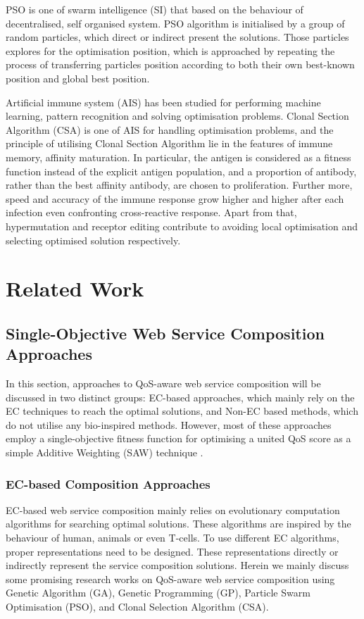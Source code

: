 PSO is one of swarm intelligence (SI) that based on the behaviour of decentralised, self organised system. PSO algorithm is initialised by a group of random particles, which direct or indirect present the solutions. Those particles explores for the optimisation position, which is approached by repeating the process of transferring particles position according to both their own best-known position and global best position.

Artificial immune system (AIS) has been studied for performing machine learning, pattern recognition and solving optimisation problems.  Clonal Section Algorithm (CSA) is one of AIS for handling optimisation problems, and the principle of utilising Clonal Section Algorithm lie in the features of immune memory, affinity maturation. In particular, the antigen is considered as a fitness function instead of the explicit antigen population, and a proportion of antibody, rather than the best affinity antibody, are chosen to proliferation. Further more, speed and accuracy of the immune response grow higher and higher after each infection even confronting cross-reactive response. Apart from that, hypermutation and receptor editing contribute to avoiding local optimisation and selecting optimised solution respectively. 


\section{Related Work}\label{related}

\subsection{Single-Objective Web Service Composition Approaches}\label{singleobjective}

In this section, approaches to QoS-aware web service composition will be discussed in two distinct groups: EC-based approaches, which mainly rely on the EC techniques to reach the optimal solutions, and Non-EC based methods, which do not utilise any bio-inspired methods. However, most of these approaches employ a single-objective fitness function for optimising a united QoS score as a simple Additive Weighting (SAW) technique \cite{hwang1981lecture}.
\subsubsection{EC-based Composition Approaches}
EC-based web service composition mainly relies on evolutionary computation algorithms for searching optimal solutions. These algorithms are inspired by the behaviour of human, animals or even T-cells. To use different EC algorithms, proper representations need to be designed. These representations directly or indirectly represent the service composition solutions. Herein we mainly discuss some promising research works on QoS-aware web service composition using  Genetic Algorithm (GA), Genetic Programming (GP), Particle Swarm Optimisation (PSO), and Clonal Selection Algorithm (CSA).

